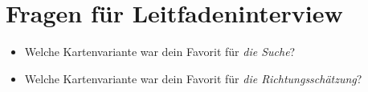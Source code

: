 \begin{appendices}
    \begin{center}
    \end{center}
    \clearpage
    
    \section*{Fragen für Leitfadeninterview}
    \label{appendix:interview}
    \vspace{2em}
    \begin{itemize}
        \item Welche Kartenvariante war dein Favorit für \emph{die Suche}?
        
        \item Welche Kartenvariante war dein Favorit für \emph{die Richtungsschätzung}?
        

\end{itemize}
\end{appendices}

